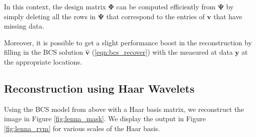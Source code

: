 In this context, the design matrix $\bm\Phi$ can be computed efficiently from $\bm\Psi$ by simply deleting all the rows in $\bm\Psi$ that correspond to the entries of $\bm v$ that have missing data.

Moreover, it is possible to get a slight performance boost in the reconstruction by filling in the BCS solution $\bm{\hat v}$ (\ref{eqn:bcs_recover}) with the measured at data $\bm y$ at the appropriate locations.

\subsection{Reconstruction using Haar Wavelets}
\label{sect:interpol_haar}
Using the BCS model from above with a Haar basis matrix, we reconstruct the image in Figure \ref{fig:lenna_mask}.
We display the output in Figure \ref{fig:lenna_rvm} for various scales of the Haar basis.
